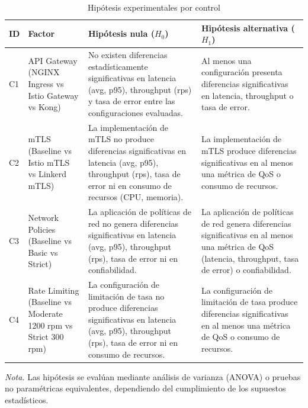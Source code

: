 \begin{table}[htbp]
\centering
\caption{Hipótesis experimentales por control}
\label{tab:hipotesis_controles}
\renewcommand{\arraystretch}{1.4}

\begin{tabular}{p{1.2cm} p{3cm} p{4.5cm} p{4.5cm}}
\hline
\textbf{ID} & \textbf{Factor} & \textbf{Hipótesis nula ($H_0$)} & \textbf{Hipótesis alternativa ($H_1$)} \\
\hline

C1 & API Gateway (NGINX Ingress vs Istio Gateway vs Kong) 
& No existen diferencias estadísticamente significativas en latencia (avg, p95), throughput (rps) y tasa de error entre las configuraciones evaluadas.
& Al menos una configuración presenta diferencias significativas en latencia, throughput o tasa de error. \\

C2 & mTLS (Baseline vs Istio mTLS vs Linkerd mTLS) 
& La implementación de mTLS no produce diferencias significativas en latencia (avg, p95), throughput (rps), tasa de error ni en consumo de recursos (CPU, memoria).
& La implementación de mTLS produce diferencias significativas en al menos una métrica de QoS o consumo de recursos. \\

C3 & Network Policies (Baseline vs Basic vs Strict) & 
La aplicación de políticas de red no genera diferencias significativas en 
latencia (avg, p95), throughput (rps), tasa de error ni en confiabilidad. &
La aplicación de políticas de red genera diferencias significativas en 
al menos una métrica de QoS (latencia, throughput, tasa de error) o confiabilidad. \\


C4 & Rate Limiting (Baseline vs Moderate 1200 rpm vs Strict 300 rpm) 
& La configuración de limitación de tasa no produce diferencias significativas en latencia (avg, p95), throughput (rps), tasa de error ni en consumo de recursos.
& La configuración de limitación de tasa produce diferencias significativas en al menos una métrica de QoS o consumo de recursos. \\

\hline
\end{tabular}

\vspace{0.2cm}
{\raggedright \small \textit{Nota.} Las hipótesis se evalúan mediante análisis de varianza (ANOVA) o pruebas no paramétricas equivalentes, dependiendo del cumplimiento de los supuestos estadísticos.\par}

\end{table}
\FloatBarrier
